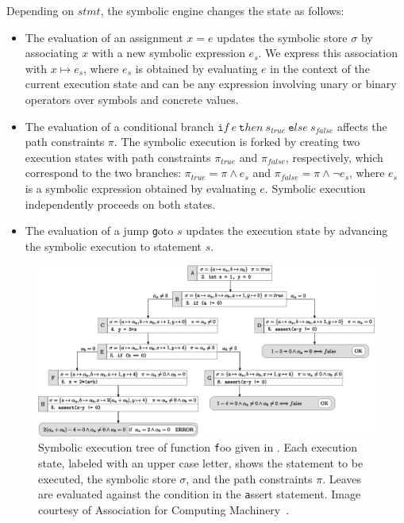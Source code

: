 \noindent Depending on $stmt$, the symbolic engine changes the state as follows:

\begin{itemize}
	\item The evaluation of an assignment $x=e$ updates the symbolic store $\sigma$ by associating $x$ with a new symbolic expression $e_s$. We express this association with $x\mapsto e_s$, where $e_s$ is obtained by evaluating $e$ in the context of the current execution state and  can be any expression involving unary or binary operators over symbols and concrete values.
	\item The evaluation of a conditional branch ${\texttt if}~e~{\texttt then}~s_{true}~{\texttt else}~s_{false}$ affects the path constraints $\pi$. The symbolic execution is forked by creating two execution states with path constraints $\pi_{true}$ and $\pi_{false}$, respectively, which correspond to the two branches: $\pi_{true}=\pi \wedge e_s$ and $\pi_{false}=\pi \wedge \neg e_s$, where $e_s$ is a symbolic expression obtained by evaluating $e$. 
	Symbolic execution independently proceeds on both states.
	\item The evaluation of a jump {\texttt goto} $s$ updates the execution state by advancing the symbolic execution to statement $s$. 
\end{itemize}

\begin{figure}[t]
	\centering
	\includegraphics[width=0.975\columnwidth]{images/execution-tree.eps} 
	\caption{Symbolic execution tree of function {\texttt foo} given in . Each execution state, labeled with an upper case letter, shows the statement to be executed, the symbolic store $\sigma$, and the path constraints $\pi$. Leaves are evaluated against the condition in the {\texttt assert} statement. Image courtesy of Association for Computing Machinery~\cite{Baldoni:2018:SSE:3212709.3182657}.}
	\label{fig:example-symbolic-execution}
	\vspace{-1mm}
\end{figure}

